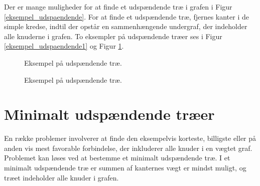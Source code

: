 \noindent Der er mange muligheder for at finde et udspændende træ i grafen i Figur \ref{eksempel_udspaendende}. For at finde et udspændende træ, fjernes kanter i de simple kredse, indtil der opstår en sammenhængende undergraf, der indeholder alle knuderne i grafen. To eksempler på udspændende træer ses i Figur \ref{eksempel_udspaendende1} og Figur \ref{eksempel_udspaendende2}.

\begin{figure}[!htb]
\begin{minipage}{1\linewidth}

\centering
{}
\caption{Eksempel på udspændende træ.}
\label{eksempel_udspaendende1}
\end{minipage}

\hfill

\begin{minipage}{1\linewidth}
\centering
{}
 \caption{Eksempel på udspændende træ.}
\label{eksempel_udspaendende2}
\end{minipage}

\end{figure}

\section{Minimalt udspændende træer}

En række problemer involverer at finde den eksempelvis korteste, billigste eller på anden vis mest favorable forbindelse, der inkluderer alle knuder i en vægtet graf. Problemet kan løses ved at bestemme et minimalt udspændende træ. I et minimalt udspændende træ er summen af kanternes vægt er mindst muligt, og træet indeholder alle knuder i grafen.


